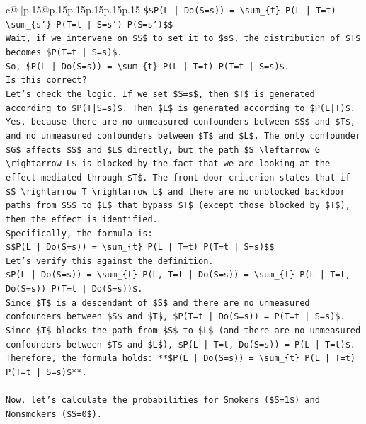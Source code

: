 \documentclass{article}
\begin{document}
{\begin{supertabular}{c@{$\;$}|p{.15\linewidth}@{}p{.15\linewidth}p{.15\linewidth}p{.15\linewidth}p{.15\linewidth}p{.15\linewidth}}
{{{\texttt{\$\$P(L | Do(S=s)) = \textbackslash{}sum\_\{t\} P(L | T=t) \textbackslash{}sum\_\{s'\} P(T=t | S=s') P(S=s')\$\$} \\
\texttt{Wait, if we intervene on \$S\$ to set it to \$s\$, the distribution of \$T\$ becomes \$P(T=t | S=s)\$.} \\
\texttt{So, \$P(L | Do(S=s)) = \textbackslash{}sum\_\{t\} P(L | T=t) P(T=t | S=s)\$.} \\
\texttt{Is this correct?} \\
\texttt{Let's check the logic. If we set \$S=s\$, then \$T\$ is generated according to \$P(T|S=s)\$. Then \$L\$ is generated according to \$P(L|T)\$.} \\
\texttt{Yes, because there are no unmeasured confounders between \$S\$ and \$T\$, and no unmeasured confounders between \$T\$ and \$L\$. The only confounder \$G\$ affects \$S\$ and \$L\$ directly, but the path \$S \textbackslash{}leftarrow G \textbackslash{}rightarrow L\$ is blocked by the fact that we are looking at the effect mediated through \$T\$. The front{-}door criterion states that if \$S \textbackslash{}rightarrow T \textbackslash{}rightarrow L\$ and there are no unblocked backdoor paths from \$S\$ to \$L\$ that bypass \$T\$ (except those blocked by \$T\$), then the effect is identified.} \\
\texttt{Specifically, the formula is:} \\
\texttt{\$\$P(L | Do(S=s)) = \textbackslash{}sum\_\{t\} P(L | T=t) P(T=t | S=s)\$\$} \\
\texttt{Let's verify this against the definition.} \\
\texttt{\$P(L | Do(S=s)) = \textbackslash{}sum\_\{t\} P(L, T=t | Do(S=s)) = \textbackslash{}sum\_\{t\} P(L | T=t, Do(S=s)) P(T=t | Do(S=s))\$.} \\
\texttt{Since \$T\$ is a descendant of \$S\$ and there are no unmeasured confounders between \$S\$ and \$T\$, \$P(T=t | Do(S=s)) = P(T=t | S=s)\$.} \\
\texttt{Since \$T\$ blocks the path from \$S\$ to \$L\$ (and there are no unmeasured confounders between \$T\$ and \$L\$), \$P(L | T=t, Do(S=s)) = P(L | T=t)\$.} \\
\texttt{Therefore, the formula holds: **\$P(L | Do(S=s)) = \textbackslash{}sum\_\{t\} P(L | T=t) P(T=t | S=s)\$**.} \\
\\ 
\texttt{Now, let's calculate the probabilities for Smokers (\$S=1\$) and Nonsmokers (\$S=0\$).} \\
\\ 
}}}
\end{supertabular}}
\end{document}
